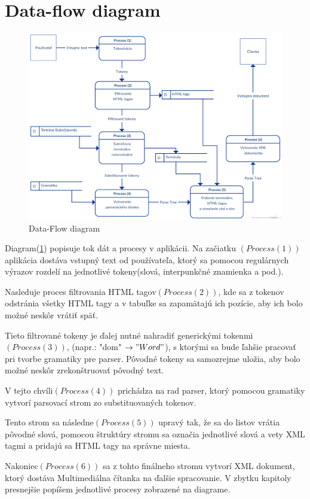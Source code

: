 \documentclass[12pt,a4paper]{report}
\theoremstyle{definition}
\theoremstyle{remark}
\begin{document}
\section{Data-flow diagram}
\begin{figure}[h]
\centering
\includegraphics[scale=0.2]{DFD}
\caption{Data-Flow diagram}
  \label{fig:dataflow}
\end{figure}

Diagram(\ref{fig:dataflow}) popisuje tok dát a procesy v aplikácii. Na začiatku $(Process (1))$ aplikácia dostáva vstupný text od používateľa, ktorý sa pomocou regulárnych výrazov rozdelí na jednotlivé tokeny(slová, interpunkčné znamienka a pod.).

 Nasleduje proces filtrovania HTML tagov$(Process (2))$, kde sa z tokenov odstránia všetky HTML tagy a v tabuľke sa zapamätajú ich pozície, aby ich bolo možné neskôr vrátiť späť. 
 
Tieto filtrované tokeny je ďalej nutné nahradiť generickými tokenmi$(Process (3))$, (napr.: "dom" $\to  "Word"$), s ktorými sa bude ľahšie pracovať pri tvorbe gramatiky pre parser. Pôvodné tokeny sa samozrejme uložia, aby bolo možné neskôr zrekonštruovať pôvodný text. 

V tejto chvíli$(Process(4))$ prichádza na rad parser, ktorý pomocou gramatiky vytvorí parsovací strom zo substituovaných tokenov. 

Tento strom sa následne$(Process (5))$ upravý tak, že sa do listov vrátia pôvodné slová, pomocou štruktúry stromu sa označia jednotlivé slová a vety XML tagmi a pridajú sa HTML tagy na správne miesta. 

Nakoniec$(Process (6))$ sa z tohto finálneho stromu vytvorí XML dokument, ktorý dostáva Multimediálna čítanka na ďalšie spracovanie. V zbytku kapitoly presnejšie popíšem jednotlivé procesy zobrazené na diagrame.
\end{document}
